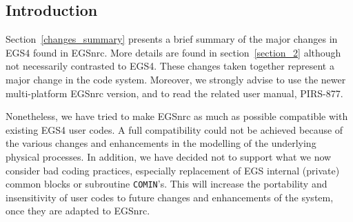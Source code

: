 
%
%
%
%
%
%
%
%
%




\subsection{Introduction}

Section~\ref{changes_summary} presents a brief summary of the major changes
in EGS4 found in EGSnrc. More details are found in section~\ref{section_2}
although not necessarily contrasted to EGS4.  These changes taken together
represent a major change in the code system. Moreover, we strongly
advise to use the newer multi-platform EGSnrc version, and to read the
related user manual, PIRS-877.

Nonetheless, we have tried to make EGSnrc as much as possible compatible 
with existing EGS4 user codes. A full compatibility 
could not be achieved because of the various 
changes and enhancements in the modelling of the 
underlying physical processes. In addition, we have 
decided not to support what we now consider bad coding practices,
especially 
replacement of EGS internal (private) common blocks or 
subroutine {\tt COMIN}'s. 
This will increase the portability and insensitivity 
of user codes to future changes and enhancements of 
the system, once they are adapted to EGSnrc. 

